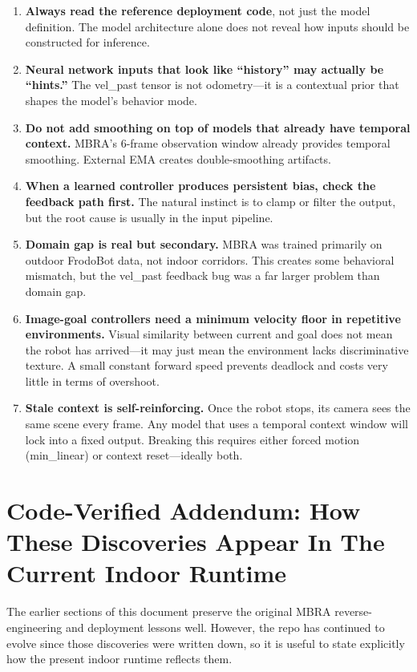 \documentclass[11pt,a4paper]{article}
\begin{document}
\begin{enumerate}
  \item \textbf{Always read the reference deployment code}, not just the model
    definition.  The model architecture alone does not reveal how inputs should
    be constructed for inference.

  \item \textbf{Neural network inputs that look like ``history'' may actually
    be ``hints.''} The vel\_past tensor is not odometry---it is a contextual
    prior that shapes the model's behavior mode.

  \item \textbf{Do not add smoothing on top of models that already have
    temporal context.}  MBRA's 6-frame observation window already provides
    temporal smoothing.  External EMA creates double-smoothing artifacts.

  \item \textbf{When a learned controller produces persistent bias, check the
    feedback path first.}  The natural instinct is to clamp or filter the
    output, but the root cause is usually in the input pipeline.

  \item \textbf{Domain gap is real but secondary.}  MBRA was trained primarily
    on outdoor FrodoBot data, not indoor corridors.  This creates some
    behavioral mismatch, but the vel\_past feedback bug was a far larger
    problem than domain gap.

  \item \textbf{Image-goal controllers need a minimum velocity floor in
    repetitive environments.}  Visual similarity between current and goal does
    not mean the robot has arrived---it may just mean the environment lacks
    discriminative texture.  A small constant forward speed prevents deadlock
    and costs very little in terms of overshoot.

  \item \textbf{Stale context is self-reinforcing.}  Once the robot stops, its
    camera sees the same scene every frame.  Any model that uses a temporal
    context window will lock into a fixed output.  Breaking this requires
    either forced motion (min\_linear) or context reset---ideally both.
\end{enumerate}


\section{Code-Verified Addendum: How These Discoveries Appear In The Current Indoor Runtime}
The earlier sections of this document preserve the original MBRA reverse-engineering and deployment lessons well. However, the repo has continued to evolve since those discoveries were written down, so it is useful to state explicitly how the present indoor runtime reflects them.
\end{document}
